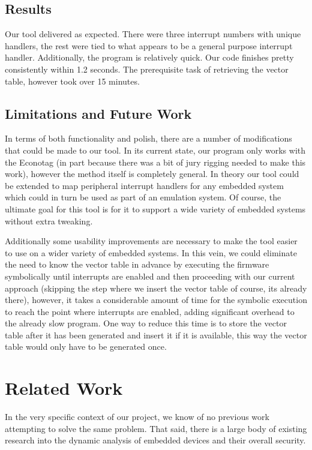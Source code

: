\documentclass[letterpaper, 10 pt, conference]{ieeeconf}
\begin{document}
\subsection{Results} %
Our tool delivered as expected. There were three interrupt numbers with unique handlers, the rest were tied to what appears to be a general purpose interrupt handler. Additionally, the program is relatively quick. Our code finishes pretty consistently within 1.2 seconds. The prerequisite task of retrieving the vector table, however took over 15 minutes. 

\subsection{Limitations and Future Work}
In terms of both functionality and polish, there are a number of modifications that could be made to our tool. In its current state, our program only works with the Econotag (in part because there was a bit of jury rigging needed to make this work), however the method itself is completely general. In theory our tool could be extended to map peripheral interrupt handlers for any embedded system which could in turn be used as part of an emulation system. Of course, the ultimate goal for this tool is for it to support a wide variety of embedded systems without extra tweaking. 

Additionally some usability improvements are necessary to make the tool easier to use on a wider variety of embedded systems. In this vein, we could eliminate the need to know the vector table in advance by executing the firmware symbolically until interrupts are enabled and then proceeding with our current approach (skipping the step where we insert the vector table of course, its already there), however, it takes a considerable amount of time for the symbolic execution to reach the point where interrupts are enabled, adding significant overhead to the already slow program. One way to reduce this time is to store the vector table after it has been generated and insert it if it is available, this way the vector table would only have to be generated once.

\section{Related Work} %
In the very specific context of our project, we know of no previous work attempting to solve the same problem. That said, there is a large body of existing research into the dynamic analysis of embedded devices and their overall security.
\end{document}
